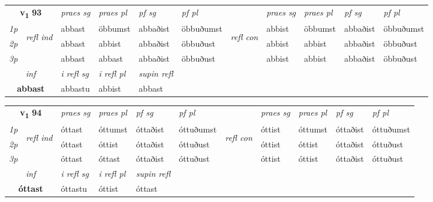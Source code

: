 \noindent
\begin{tabular}{lllllllllll} \toprule
\multicolumn{2}{c}{\textbf{v{\textsubscript{1}}} \Large{\textbf{93}}}  &  \textit{praes sg}  & \textit{praes pl}  &\textit{ pf sg} & \textit{pf pl} &  &  \textit{praes sg}  & \textit{praes pl}  & \textit{pf sg} & \textit{pf pl } \\*
	\cmidrule{3-6} \cmidrule{8-11}
 {\textit{1p}} & \multirow{3}{*}{\begin{turn}{90}\textit{refl ind}\end{turn}}  & abbast & öbbumst & abbaðist & öbbuðumst & \multirow{3}{*}{\begin{turn}{90}\textit{refl con}\end{turn}}  &abbist & öbbumst & abbaðist & öbbuðumst \\*
 {\textit{2p}} &  & abbast & abbist & abbaðist & öbbuðust & &abbist & abbist & abbaðist & öbbuðust \\*
 {\textit{3p}}  & & abbast & abbast & abbaðist & öbbuðust & & abbist & abbist& abbaðist & öbbuðust \\*
\cmidrule{3-6} \cmidrule{8-11}

   \multicolumn{2}{c}{\textit{inf}}   & \textit{i refl sg} & \textit{i refl pl}   & \textit{supin refl}  \\*
  \multicolumn{2}{c}{\textbf{abbast}}    & abbastu & abbist   & abbast  \\*
\end{tabular}

\noindent
\begin{tabular}{lllllllllll} \toprule
\multicolumn{2}{c}{\textbf{v{\textsubscript{1}}} \Large{\textbf{94}}}  &  \textit{praes sg}  & \textit{praes pl}  &\textit{ pf sg} & \textit{pf pl} &  &  \textit{praes sg}  & \textit{praes pl}  & \textit{pf sg} & \textit{pf pl } \\*
	\cmidrule{3-6} \cmidrule{8-11}
 {\textit{1p}} & \multirow{3}{*}{\begin{turn}{90}\textit{refl ind}\end{turn}}  & óttast & óttumst & óttaðist & óttuðumst & \multirow{3}{*}{\begin{turn}{90}\textit{refl con}\end{turn}}  &óttist & óttumst & óttaðist & óttuðumst \\*
 {\textit{2p}} &  & óttast & óttist & óttaðist & óttuðust & &óttist & óttist & óttaðist & óttuðust \\*
 {\textit{3p}}  & & óttast & óttast & óttaðist & óttuðust & & óttist & óttist& óttaðist & óttuðust \\*
\cmidrule{3-6} \cmidrule{8-11}

   \multicolumn{2}{c}{\textit{inf}}   & \textit{i refl sg} & \textit{i refl pl}   & \textit{supin refl}  \\*
  \multicolumn{2}{c}{\textbf{óttast}}    & óttastu & óttist   & óttast  \\*
\end{tabular}

